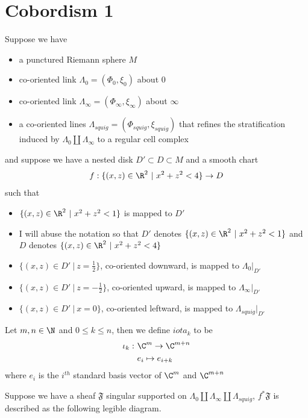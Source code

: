 \section{Cobordism 1}
Suppose we have 
\begin{itemize}
\item a punctured Riemann sphere $M$

\item co-oriented link $\Lambda_0 = (\Phi_0,\xi_0)$ about $0$

\item co-oriented link $\Lambda_\infty = (\Phi_\infty,\xi_\infty)$ about $\infty$ 

\item a co-oriented lines $\Lambda_{squig} = (\Phi_{squig}, \xi_{squig})$ that refines the stratification induced by $\Lambda_0 \coprod \Lambda_\infty$ to a regular cell complex 
\end{itemize}
and suppose we have a nested disk $D' \subset D \subset M$ and a smooth chart
\[
	f: \{(x,z)\in \R^2 ~|~ x^2+z^2 < 4 \} \rightarrow D
\]
such that 
\begin{itemize}
\item $\{(x,z)\in \R^2 ~|~ x^2+z^2 < 1\}$ is mapped to $D'$ 

\item I will abuse the notation so that $D'$ denotes $\{(x,z)\in \R^2 ~|~ x^2+z^2 < 1\}$ and $D$ denotes $\{(x,z)\in \R^2 ~|~ x^2+z^2 < 4 \}$

\item $\{(x,z)\in D' ~|~ z = \frac{1}{2} \}$, co-oriented downward, is mapped to $\Lambda_0 |_{D'}$

\item $\{(x,z)\in D' ~|~ z = -\frac{1}{2} \}$, co-oriented upward, is mapped to $\Lambda_\infty |_{D'}$

\item $\{(x,z)\in D' ~|~ x = 0 \}$, co-oriented leftward, is mapped to $\Lambda_{squig} |_{D'}$
\end{itemize}
\begin{definition}
Let $m,n \in \N$ and $0\leq k \leq n$, then we define $iota_k$ to be
	\begin{align*}
		\iota_k : & ~ \C^{m} \rightarrow \C^{m+n} \\
		& ~ e_i \mapsto e_{i+k}
	\end{align*}
	where $e_i$ is the $i^{th}$ standard basis vector of $\C^m$ and $\C^{m+n}$		
\end{definition}
Suppose we have a sheaf $\mathfrak{F}$ singular supported on $\Lambda_0 \coprod \Lambda_\infty \coprod \Lambda_{squig}$, $f^*\mathfrak{F}$ is described as the following legible diagram.

